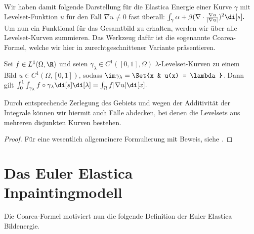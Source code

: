 \documentclass{mythesis}
\begin{document}
Wir haben damit folgende Darstellung für die Elastica Energie einer Kurve $\gamma$ mit Levelset-Funktion $u$ für den Fall $\nabla u \neq 0$ fast überall:
\begin{math}
    \int_\gamma \alpha + \beta (\nabla \cdot \frac{\nabla u}{|\nabla u|})^2 \di[s].
\end{math}
Um nun ein Funktional für das Gesamtbild zu erhalten, werden wir über alle Levelset-Kurven summieren.
Das Werkzeug dafür ist die sogenannte Coarea-Formel, welche wir hier in zurechtgeschnittener Variante präsentieren.

\begin{proposition} \label{satz:coarea}
    Sei $f \in L^1(\Omega, \R)$ und seien $\gamma_\lambda \in C^1([0,1], \Omega)$ $\lambda$-Levelset-Kurven zu einem Bild $u \in C^1(\Omega, [0,1])$, sodass $\im \gamma_\lambda = \Set{x & u(x) = \lambda}$.
    Dann gilt
    \begin{math}
	\int_0^1 \int_{\gamma_\lambda} f \circ \gamma_\lambda \di[s] \di[\lambda]
	= \int_\Omega f |\nabla u| \di[x].
    \end{math}
    \begin{note}
        Durch entsprechende Zerlegung des Gebiets und wegen der Additivität der Integrale können wir hiermit auch Fälle abdecken, bei denen die Levelsets aus mehreren disjunkten Kurven bestehen.
    \end{note}
    \begin{proof}
        Für eine wesentlich allgemeinere Formulierung mit Beweis, siehe \cite[§3.4]{evans2015measure}.
    \end{proof}
\end{proposition}


\section{Das Euler Elastica Inpaintingmodell}


Die Coarea-Formel motiviert nun die folgende Definition der Euler Elastica Bildenergie.
\end{document}
